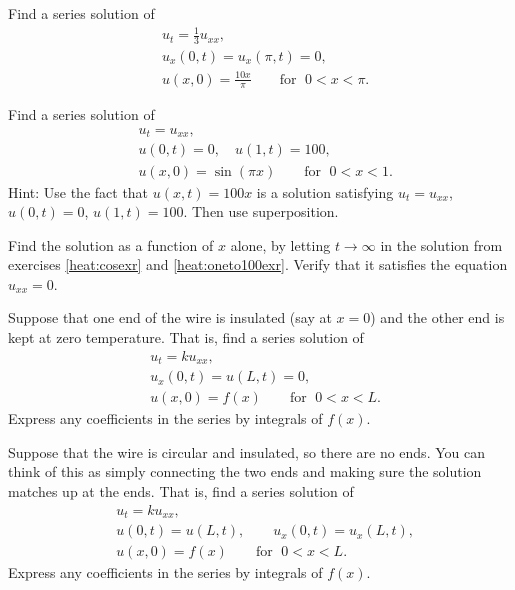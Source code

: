 \documentclass{ximera}
\begin{document}
\begin{exercise} \label{heat:cosexr}
    Find a series solution of
    \begin{align*}
        & u_t = \frac{1}{3} u_{xx} , \\
        & u_x(0,t) = u_x(\pi,t) = 0 , \\
        & u(x,0) = \frac{10x}{\pi} \qquad \text{for } \; 0 < x < \pi .
    \end{align*}
\end{exercise}

\begin{exercise} \label{heat:oneto100exr}
    Find a series solution of
    \begin{align*}
        & u_t =  u_{xx} , \\
        & u(0,t) = 0 , \quad u(1,t) = 100 , \\
        & u(x,0) = \sin (\pi x) \qquad \text{for } \; 0 < x < 1 .
    \end{align*}
    Hint: Use the fact that $u(x,t) = 100 x$ is a solution satisfying $u_t = u_{xx}$, $u(0,t) = 0$, $u(1,t) = 100$.  Then use superposition.
\end{exercise}

\begin{exercise}
    Find the \emph{} solution as a function of $x$ alone, by letting $t \to \infty$ in the solution from exercises \ref{heat:cosexr} and \ref{heat:oneto100exr}. Verify that it satisfies the equation $u_{xx} = 0$.
\end{exercise}

\begin{exercise}%
    Suppose that one end of the wire is insulated (say at $x=0$) and the other end is kept at zero temperature.  That is, find a series solution of
    \begin{align*}
        & u_t = k u_{xx} , \\
        & u_x(0,t) = u(L,t) = 0 , \\
        & u(x,0) = f(x) \qquad \text{for } \; 0 < x < L .
    \end{align*}
    Express any coefficients in the series by integrals of $f(x)$.
\end{exercise}

\begin{exercise}%
    Suppose that the wire is circular and insulated, so there are no ends. You can think of this as simply connecting the two ends and making sure the solution matches up at the ends. That is, find a series solution of
    \begin{align*}
        & u_t = k u_{xx} , \\
        & u(0,t) = u(L,t) , \qquad u_x(0,t) = u_x(L,t) , \\
        & u(x,0) = f(x) \qquad \text{for } \; 0 < x < L .
    \end{align*}
    Express any coefficients in the series by integrals of $f(x)$.
\end{exercise}
\end{document}
